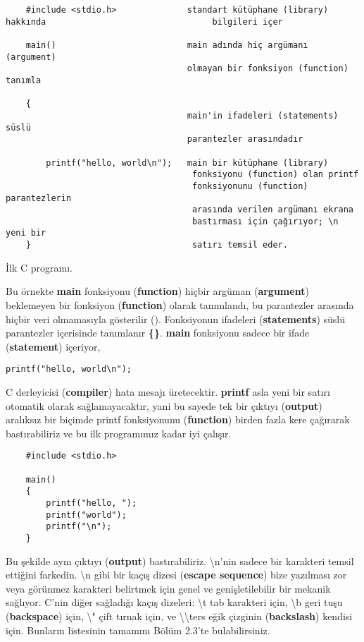 \documentclass[a4paper,12pt,oneside]{book}
\begin{document}
\begin{lstlisting}
    #include <stdio.h>              standart kütüphane (library) hakkında                                 bilgileri içer

    main()                          main adında hiç argümanı (argument)
                                    olmayan bir fonksiyon (function) tanımla

    {
                                    main'in ifadeleri (statements) süslü
                                    parantezler arasındadır

        printf("hello, world\n");   main bir kütüphane (library)
                                     fonksiyonu (function) olan printf
                                     fonksiyonunu (function) parantezlerin
                                     arasında verilen argümanı ekrana
                                     bastırması için çağırıyor; \n yeni bir
    }                                satırı temsil eder.
\end{lstlisting}
\begin{center}İlk C programı.\end{center}
\pagebreak

Bu örnekte \textbf{main} fonksiyonu (\textbf{function}) hiçbir argüman (\textbf{argument}) beklemeyen bir fonksiyon (\textbf{function}) olarak tanımlandı, bu parantezler arasında hiçbir veri olmamasıyla gösterilir ().
Fonksiyonun ifadeleri (\textbf{statements}) süslü parantezler içerisinde tanımlanır \textbf{\{\}}. \textbf{main} fonksiyonu sadece bir ifade (\textbf{statement}) içeriyor,
\begin{lstlisting}
printf("hello, world\n");
\end{lstlisting}
C derleyicisi (\textbf{compiler}) hata mesajı üretecektir.
\textbf{printf} asla yeni bir satırı otomatik olarak sağlamayacaktır, yani bu sayede tek bir çıktıyı (\textbf{output}) aralıksız bir biçimde printf fonksiyonunu (\textbf{function}) birden fazla kere çağırarak bastırabiliriz ve bu ilk programımız kadar iyi çalışır.

\begin{lstlisting}
    #include <stdio.h>

    main()
    {
        printf("hello, ");
        printf("world");
        printf("\n");
    }
\end{lstlisting}

Bu şekilde aynı çıktıyı (\textbf{output}) bastırabiliriz.
\textbackslash n'nin sadece bir karakteri temsil ettiğini farkedin. \textbackslash n  gibi bir kaçış dizesi (\textbf{escape sequence}) bize yazılması zor veya görünmez karakteri belirtmek için genel ve genişletilebilir bir mekanik sağlıyor. C'nin diğer sağladığı kaçış dizeleri: \textbackslash t tab karakteri için, \textbackslash b geri tuşu (\textbf{backspace}) için, \textbackslash " çift tırnak için, ve  \textbackslash \textbackslash \hspace*{1mm}ters eğik çizginin (\textbf{backslash}) kendisi için. Bunların listesinin tamamını Bölüm 2.3'te bulabilirsiniz. \\
\end{document}
